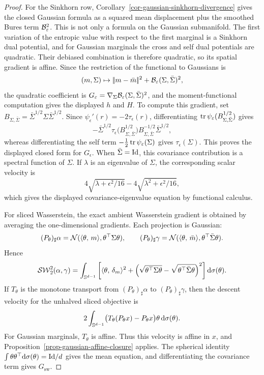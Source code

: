 \begin{proof}
	For the Sinkhorn row, Corollary~\ref{cor-gaussian-sinkhorn-divergence} gives the closed Gaussian formula as a squared mean displacement plus the smoothed Bures term \(\mathcal{B}_\varepsilon^2\). This is not only a formula on the Gaussian submanifold. The first variation of the entropic value with respect to the first marginal is a Sinkhorn dual potential, and for Gaussian marginals the cross and self dual potentials are quadratic. Their debiased combination is therefore quadratic, so its spatial gradient is affine. Since the restriction of the functional to Gaussians is
	\[
		(m,\Sigma)\mapsto |\!| m-\bar m |\!|^2+\mathcal{B}_\varepsilon(\Sigma,\bar\Sigma)^2,
	\]
	the quadratic coefficient is \(G_\varepsilon=\nabla_\Sigma\mathcal{B}_\varepsilon(\Sigma,\bar\Sigma)^2\), and the moment-functional computation gives the displayed \(h\) and \(H\). To compute this gradient, set \(B_{\Sigma,\bar\Sigma}=\bar\Sigma^{1/2}\Sigma\bar\Sigma^{1/2}\). Since \(\psi_\epsilon'(r)=-2\tau_\epsilon(r)\), differentiating
	\(\operatorname{tr}\psi_\varepsilon(B_{\Sigma,\bar\Sigma}^{1/2})\) gives
	\[
		-\bar\Sigma^{1/2}
		\tau_\epsilon\bigl(B_{\Sigma,\bar\Sigma}^{1/2}\bigr)
		B_{\Sigma,\bar\Sigma}^{-1/2}
		\bar\Sigma^{1/2},
	\]
	whereas differentiating the self term
	\(-\frac12\operatorname{tr}\psi_\varepsilon(\Sigma)\) gives \(\tau_\epsilon(\Sigma)\). This proves the displayed closed form for \(G_\epsilon\). When \(\bar\Sigma=\mathrm{Id}\), this covariance contribution is a spectral function of \(\Sigma\). If \(\lambda\) is an eigenvalue of \(\Sigma\), the corresponding scalar velocity is
	\[
		4\sqrt{\lambda+\epsilon^2/16}-4\sqrt{\lambda^2+\epsilon^2/16},
	\]
		which gives the displayed covariance-eigenvalue equation by functional calculus.

	For sliced Wasserstein, the exact ambient Wasserstein gradient is obtained by averaging the one-dimensional gradients. Each projection is Gaussian:
	\[
		(P_\theta)_\sharp\alpha=\mathcal{N}(\langle \theta,\,m\rangle,\theta^\top\Sigma\theta),
		\qquad
		(P_\theta)_\sharp\gamma=\mathcal{N}(\langle \theta,\,\bar m\rangle,\theta^\top\bar\Sigma\theta).
	\]
	Hence
	\[
		\operatorname{\mathcal{SW}}_2^2(\alpha,\gamma)
		=
		\int_{\mathbb{S}^{d-1}}
		\left[
			\langle \theta,\,\delta_m\rangle^2
			+
			\left(\sqrt{\theta^\top\Sigma\theta}
			-\sqrt{\theta^\top\bar\Sigma\theta}\right)^2
		\right]\mathrm{d}\sigma(\theta).
	\]
	If \(T_\theta\) is the monotone transport from \((P_\theta)_\sharp\alpha\) to \((P_\theta)_\sharp\gamma\), then the descent velocity for the unhalved sliced objective is
	\[
		2\int_{\mathbb{S}^{d-1}}\bigl(T_\theta(P_\theta x)-P_\theta x\bigr)\theta\,\mathrm{d}\sigma(\theta).
	\]
	For Gaussian marginals, \(T_\theta\) is affine. Thus this velocity is affine in \(x\), and Proposition~\ref{prop-gaussian-affine-closure} applies. The spherical identity \(\int\theta\theta^\top\mathrm{d}\sigma(\theta)=\mathrm{Id}/d\) gives the mean equation, and differentiating the covariance term gives \(G_{\mathrm{sw}}\).
\end{proof}

